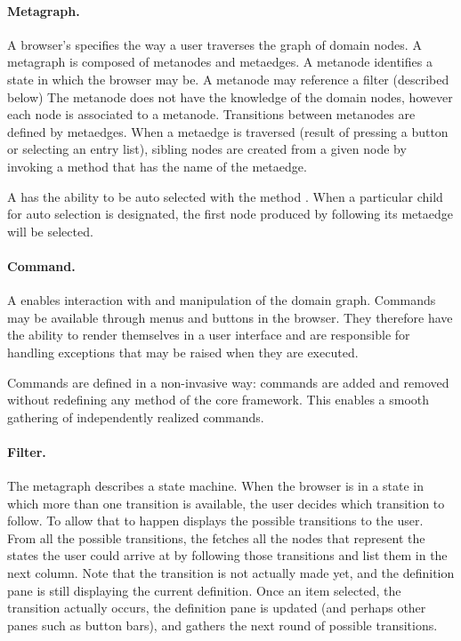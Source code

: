 \documentclass[a4paper,10pt,twoside]{book}
\begin{document}
\paragraph{Metagraph.} A browser's  specifies the way a user traverses the graph of domain nodes. A metagraph is composed of metanodes and metaedges. A metanode identifies a state in which the browser may be. A metanode may reference a filter (described below)
The metanode does not have the knowledge of the domain nodes, however each node is associated to a metanode. Transitions between meta\-nodes are defined by metaedges. When a metaedge is traversed (\ie result of pressing a button or selecting an entry list), sibling nodes are created from a given node by invoking a method that has the name of the metaedge.

A  has the ability to be auto selected with the method . When a particular child for auto selection is designated, the first node produced by following its metaedge will be selected.

\paragraph{Command.} A  enables interaction with and manipulation of the domain graph. Commands may be available through menus and buttons in the browser. They therefore have the ability to render themselves in a user interface and are responsible for handling exceptions that may be raised when they are executed. 

Commands are defined in a non-invasive way: commands are added and removed without redefining any method of the core framework. This enables a smooth gathering of independently realized commands.

\paragraph{Filter.} 
The metagraph describes a state machine. When the browser is in a state in which more than one transition is available, the user decides which transition to follow. To allow that to happen \ob displays the possible transitions  to the user. From all the possible transitions, the \obf fetches all the nodes that represent the states the user could arrive at by following those transitions and list them in the next column. Note that the transition is not actually made yet, and the definition pane is still displaying the current definition. Once an item selected, the transition  actually occurs, the definition pane is updated (and perhaps other panes such as button bars), and \ob gathers the next round of possible transitions.
\end{document}
